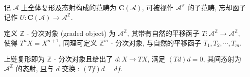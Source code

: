 \begin{remark}
    记 \(\mathcal{A}\) 上全体复形及态射构成的范畴为 \(\mathbf{C} (\mathcal{A})\), 可被视作 \(\mathcal{A}^{\mathbb{Z}}\) 的子范畴,
    忘却函子记作 \(U : \mathbf{C} (\mathcal{A}) \to \mathcal{A}^{\mathbb{Z}}\).
\end{remark}

\begin{definition}[分次对象]
    \label {definition:graded object}
    定义 \(\mathbb{Z}\) - 分次对象 (graded object) 为 \(\mathcal{A}^\mathbb{Z}\), 其带有自然的平移函子 \(T : \mathcal{A}^\mathbb{Z} \to \mathcal{A}^\mathbb{Z}\), 使得 \(T^n X = X^{n+1}\),
    同理可定义 \(\mathbb{Z}^m\) - 分次对象, 与自然的平移函子 \(T_1, T_2, \cdots, T_m\).
\end{definition}

\begin{remark}
    上链复形即为 \(\mathbb{Z}\) - 分次对象且给出了 \(d : X \to TX\), 满足 \((Td) d = 0\),
    其间态射为 \(\mathcal{A}^\mathbb{Z}\) 的态射, 且与 \(d\) 交换 : \((Tf) d = d f\).
\end{remark}

